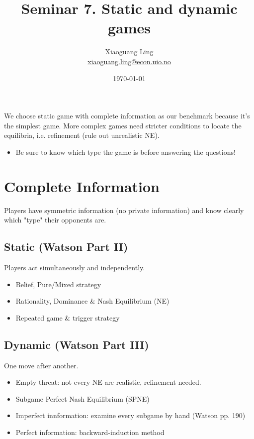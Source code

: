 \documentclass{article}
\title{Seminar 7. Static and dynamic games}
\author{Xiaoguang Ling \\  \href{xiaoguang.ling@econ.uio.no}{xiaoguang.ling@econ.uio.no}}
\date{\today}
\begin{document}
\maketitle

\begin{mdframed}[backgroundcolor=blue!20,linecolor=white]

We choose static game with complete information as our benchmark 
because it's the simplest game. More complex games need stricter conditions to locate the equilibria, i.e. refinement (rule out unrealistic NE). 
\begin{itemize}
\item Be sure to know which type the game is before answering
the questions!
\end{itemize}

\section*{Complete Information}

Players have symmetric information (no private information) and
know clearly which "type" their opponents are.


\subsection*{\hspace{4mm} Static (Watson Part II)}
\hspace{4mm} Players act simultaneously and independently.
\begin{itemize}
\item Belief, Pure/Mixed strategy
\item Rationality, Dominance \& Nash Equilibrium (NE)
\item Repeated game \& trigger strategy
\end{itemize}

\subsection*{\hspace{4mm} Dynamic (Watson Part III)}
\hspace{4mm} One move after another.
\begin{itemize}	
\item Empty threat: not every NE are realistic, refinement needed.
\item Subgame Perfect Nash Equilibrium (SPNE)
\item Imperfect innformation: examine every subgame by hand (Watson pp. 190)
\item Perfect information: backward-induction method
\end{itemize}


\end{mdframed}
\end{document}
